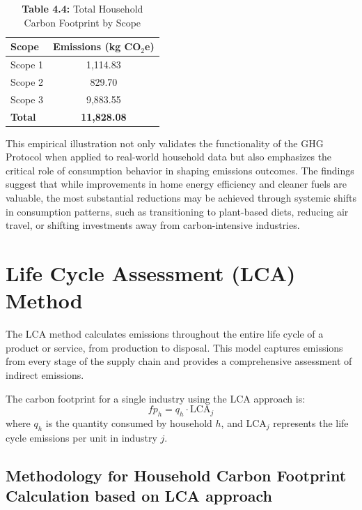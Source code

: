 \documentclass[12pt,a4paper]{article}%
\begin{document}
\begin{table}[h]
\centering
\caption*{\textbf{Table 4.4:} Total Household Carbon Footprint by Scope}
\label{tab:total_emissions}
\begin{tabular}{lc}
\toprule
\textbf{Scope} & \textbf{Emissions (kg CO$_2$e)} \\
\midrule
Scope 1 & 1,114.83 \\
Scope 2 &   829.70 \\
Scope 3 & 9,883.55 \\
\midrule
\textbf{Total} & \textbf{11,828.08} \\
\bottomrule
\end{tabular}
\end{table}


This empirical illustration not only validates the functionality of the GHG Protocol when applied to real-world household data but also emphasizes the critical role of consumption behavior in shaping emissions outcomes. The findings suggest that while improvements in home energy efficiency and cleaner fuels are valuable, the most substantial reductions may be achieved through systemic shifts in consumption patterns, such as transitioning to plant-based diets, reducing air travel, or shifting investments away from carbon-intensive industries.
\section{Life Cycle Assessment (LCA) Method}
The LCA method calculates emissions throughout the entire life cycle of a product or service, from production to disposal. This model captures emissions from every stage of the supply chain and provides a comprehensive assessment of indirect emissions.

The carbon footprint for a single industry using the LCA approach is:
\[
fp_h = q_h \cdot \text{LCA}_j
\]
where \(q_h\) is the quantity consumed by household \(h\), and \(\text{LCA}_j\) represents the life cycle emissions per unit in industry \(j\).


\subsection{Methodology for Household Carbon Footprint Calculation based on LCA approach}
\end{document}

